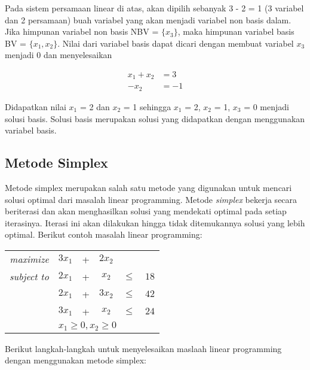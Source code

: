 Pada sistem persamaan linear di atas, akan dipilih sebanyak 3 - 2 = 1 (3 variabel dan 2 persamaan) buah variabel yang akan menjadi variabel non basis dalam. Jika himpunan variabel non basis NBV = \(\{x_3\}\), maka himpunan variabel basis BV = \(\{x_1, x_2\}\). Nilai dari variabel basis dapat dicari dengan membuat variabel \(x_3\) menjadi 0 dan menyelesaikan

\begin{equation*}
	\begin{split}
		x_1 + x_2 &= 3\\
		-x_2 &= -1
	\end{split}
\end{equation*}

Didapatkan nilai \(x_1\) = 2 dan \(x_2\) = 1 sehingga \(x_1\) = 2, \(x_2\) = 1, \(x_3\) = 0 menjadi solusi basis. Solusi basis merupakan solusi yang didapatkan dengan menggunakan variabel basis.

\subsection{Metode Simplex}
\label{metode_simplex}

Metode simplex merupakan salah satu metode yang digunakan untuk mencari solusi optimal dari masalah linear programming. Metode \textit{simplex} bekerja secara beriterasi dan akan menghasilkan solusi yang mendekati optimal pada setiap iterasinya. Iterasi ini akan dilakukan hingga tidak ditemukannya solusi yang lebih optimal. Berikut contoh masalah linear programming:

\begin{center}
	\begin{tabular}{r c @{}c @{}c c l}
		\textit{maximize}   & $3x_1$ & + & $2x_2$ \\
		\textit{subject to} & $2x_1$ & + & $x_2$  & $\leq$ & $18$ \\
        					& $2x_1$ & + & $3x_2$ & $\leq$ & $42$ \\
                           	& $3x_1$ & + & $x_2$  & $\leq$ & $24$ \\
                           	& \multicolumn{5}{l}{$x_1\geq0,x_2\geq0$} \\
	\end{tabular}
\end{center}
        
Berikut langkah-langkah untuk menyelesaikan maslaah linear programming dengan menggunakan metode simplex:


